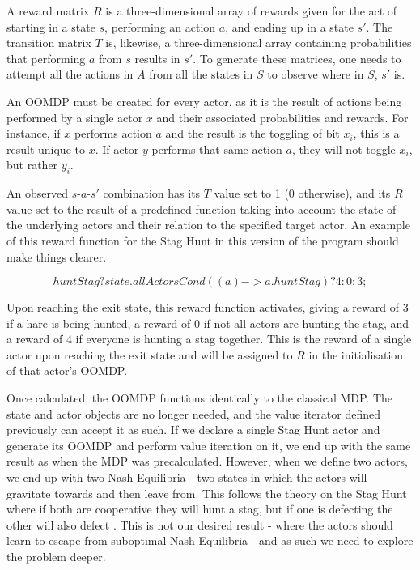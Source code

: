 A reward matrix $R$ is a three-dimensional array of rewards given for the act of starting in a state $s$, performing an action $a$, and ending up in a state $s'$. The transition matrix $T$ is, likewise, a three-dimensional array containing probabilities that performing $a$ from $s$ results in $s'$. To generate these matrices, one needs to attempt all the actions in $A$ from all the states in $S$ to observe where in $S$, $s'$ is. 

An OOMDP must be created for every actor, as it is the result of actions being performed by a single actor $x$ and their associated probabilities and rewards. For instance, if $x$ performs action $a$ and the result is the toggling of bit $x_i$, this is a result unique to $x$. If actor $y$ performs that same action $a$, they will not toggle $x_i$, but rather $y_i$. 

An observed $s$-$a$-$s'$ combination has its $T$ value set to 1 (0 otherwise), and its $R$ value set to the result of a predefined function taking into account the state of the underlying actors and their relation to the specified target actor. An example of this reward function for the Stag Hunt in this version of the program should make things clearer.

\[huntStag ? state.allActorsCond((a) -> a.huntStag) ? 4 : 0 : 3;\]

Upon reaching the exit state, this reward function activates, giving a reward of 3 if a hare is being hunted, a reward of 0 if not all actors are hunting the stag, and a reward of 4 if everyone is hunting a stag together. This is the reward of a single actor upon reaching the exit state and will be assigned to $R$ in the initialisation of that actor's OOMDP.

Once calculated, the OOMDP functions identically to the classical MDP. The state and actor objects are no longer needed, and the value iterator defined previously can accept it as such. If we declare a single Stag Hunt actor and generate its OOMDP and perform value iteration on it, we end up with the same result as when the MDP was precalculated. However, when we define two actors, we end up with two Nash Equilibria - two states in which the actors will gravitate towards and then leave from. This follows the theory on the Stag Hunt where if both are cooperative they will hunt a stag, but if one is defecting the other will also defect \cite{StagHunt}. This is not our desired result - where the actors should learn to escape from suboptimal Nash Equilibria - and as such we need to explore the problem deeper.

